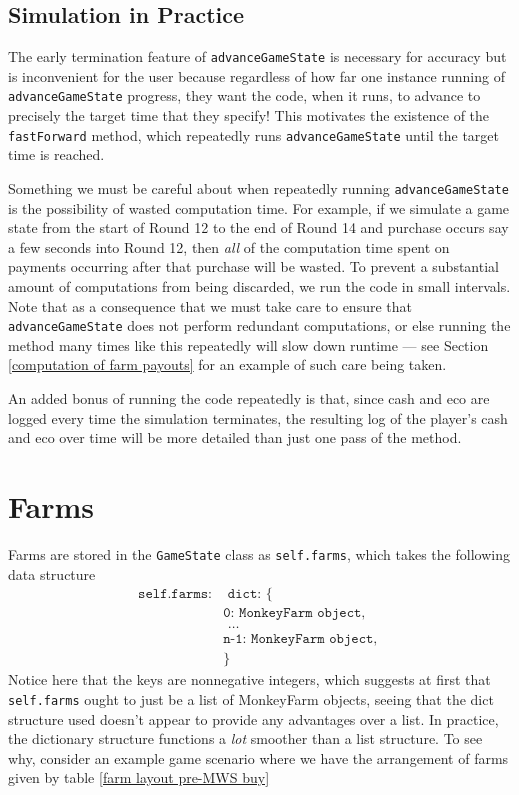 \documentclass[12pt,letterpaper]{article}
\theoremstyle{remark}
\theoremstyle{plain}
\begin{document}
\subsection{Simulation in Practice}

The early termination feature of \texttt{advanceGameState} is necessary for accuracy but is inconvenient for the user because regardless of how far one instance running of \texttt{advanceGameState} progress, they want the code, when it runs, to advance to precisely the target time that they specify!  This motivates the existence of the \texttt{fastForward} method, which repeatedly runs \texttt{advanceGameState} until the target time is reached.

Something we must be careful about when repeatedly running \texttt{advanceGameState} is the possibility of wasted computation time. For example, if we simulate a game state from the start of Round 12 to the end of Round 14 and purchase occurs say a few seconds into Round 12, then \textit{all} of the computation time spent on payments occurring after that purchase will be wasted. To prevent a substantial amount of computations from being discarded, we run the code in small intervals. Note that as a consequence that we must take care to ensure that \texttt{advanceGameState} does not perform redundant computations, or else running the method many times like this repeatedly will slow down runtime --- see Section \ref{computation of farm payouts} for an example of such care being taken.

An added bonus of running the code repeatedly is that, since cash and eco are logged every time the simulation terminates, the resulting log of the player's cash and eco over time will be more detailed than just one pass of the method.

\section{Farms}

Farms are stored in the \texttt{GameState} class as \texttt{self.farms}, which takes the following data structure
\begin{align*}
\texttt{self.farms:} & \texttt{ dict: \{ } \\
& \texttt{0: MonkeyFarm object, } \\
& \texttt{ \ldots } \\
& \texttt{n-1: MonkeyFarm object, } \\
& \texttt{\}}
\end{align*}
Notice here that the keys are nonnegative integers, which suggests at first that \texttt{self.farms} ought to just be a list of MonkeyFarm objects, seeing that the dict structure used doesn't appear to provide any advantages over a list. In practice, the dictionary structure functions a \textit{lot} smoother than a list structure. To see why, consider an example game scenario where we have the arrangement of farms given by table \ref{farm layout pre-MWS buy}
\end{document}
